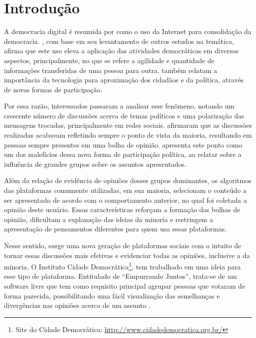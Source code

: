 \chapter[Introdução]{Introdução} \label{cap:introducao}

A democracia digital é resumida por  como o uso da Internet para consolidação da democracia.
, com base em seu levantamento de outros estudos na temática, afirma que este uso
eleva a aplicação das atividades democráticas em diversos aspectos, principalmente, no que se refere a agilidade e quantidade
de informações transferidas de uma pessoa para outra.  também relatam a importância da tecnologia
para aproximação dos cidadãos e da política, através de novas formas de participação. 

Por essa razão, interessados passaram a analisar esse fenômeno, notando um crescente número de discussões acerca de temas políticos 
e uma polarização das mensagens trocadas,
principalmente em redes sociais.  afirmaram que as discussões realizadas
acabavam refletindo sempre o ponto de vista da maioria, resultando em pessoas sempre presentes em uma bolha de opinião. 
apresenta este ponto como um dos malefícios dessa nova forma de participação política, ao relatar sobre a influência de grandes grupos 
sobre os assuntos apresentados.

Além da relação de evidência de opiniões desses grupos dominantes, os algoritmos
das plataformas comumente utilizadas, em sua maioria, selecionam o conteúdo a ser apresentado de acordo com o comportamento anterior,
no qual foi coletada a opinião deste usuário. Essas características reforçam a formação das bolhas de opinião, 
dificultam a explanação das ideias da minoria e restringem a apresentação de pensamentos diferentes para quem usa essas plataformas. 

Nesse sentido, surge uma nova geração de plataformas sociais com o intuito de tornar essas discussões mais efetivas 
e evidenciar todas as opiniões, inclusive a da minoria. O Instituto Cidade Democrática\footnote{Site do Cidade Democrática: \url{http://www.cidadedemocratica.org.br/}},
tem trabalhado em uma ideia para esse tipo de plataforma. Entitulado de ``Empurrando Juntos'', 
trata-se de um software livre que tem como requisito principal agrupar pessoas que votaram de forma parecida, 
possibilitando uma fácil visualização das semelhanças e divergências nas opiniões acerca de um assunto \cite{empurrandojuntos}. 

